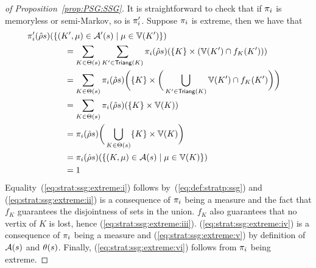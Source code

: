 \begin{proof}[of Proposition~\ref{prop:PSG:SSG}]
  It is straightforward to check that if $\pi_{i}$ is memoryless or
  semi-Markov, so is $\pi'_{i}$.  Suppose $\pi_{i}$ is extreme,
  then we have that
  \begin{align}
    \strat'_{i}(\hat{\rho}s)(\{(K',\mu)\in\sgactions'(s)\mid\mu\in\vertices(K')\}) \hspace{-12em}
    \notag\\
    & =
    \sum_{K\in\psgtrans(s)} \sum_{K'\in\Triang(K)} \strat_{i}(\hat{\rho}s)(\{K\}\times(\vertices(K')\cap f_K(K')))
    \label{eq:strat:ssg:extreme:i}\\
    & =
    \sum_{K\in\psgtrans(s)} \strat_{i}(\hat{\rho}s)\bigg(\{K\}\times\bigg(\bigcup_{K'\in\Triang(K)}\vertices(K')\cap f_K(K')\bigg)\bigg)
    \label{eq:strat:ssg:extreme:ii}\\
    & =
    \sum_{K\in\psgtrans(s)} \strat_{i}(\hat{\rho}s)(\{K\}\times\vertices(K))
    \label{eq:strat:ssg:extreme:iii}\\
    & =
    \strat_{i}(\hat{\rho}s)\bigg(\bigcup_{K\in\psgtrans(s)}\{K\}\times\vertices(K)\bigg)
    \label{eq:strat:ssg:extreme:iv}\\
    & =
    \strat_{i}(\hat{\rho}s)(\{(K,\mu)\in\sgactions(s)\mid\mu\in\vertices(K)\})
    \label{eq:strat:ssg:extreme:v}\\
    & = 1
    \label{eq:strat:ssg:extreme:vi}
  \end{align}
  Equality~(\ref{eq:strat:ssg:extreme:i}) follows
  by~(\ref{eq:def:stratp:ssg}) and (\ref{eq:strat:ssg:extreme:ii}) is
  a consequence of $\pi_{i}$ being a measure and the fact that
  $f_K$ guarantees the disjointness of sets in the union.
  $f_K$ also guarantees that no vertix of $K$ is lost, hence
  (\ref{eq:strat:ssg:extreme:iii}).
  (\ref{eq:strat:ssg:extreme:iv}) is a consequence of $\pi_{i}$
  being a measure and (\ref{eq:strat:ssg:extreme:v}) by definition of
  $\mathcal{A}(s)$ and $\theta(s)$.
  Finally, (\ref{eq:strat:ssg:extreme:vi}) follows from $\pi_{i}$
  being extreme.


\end{proof}
